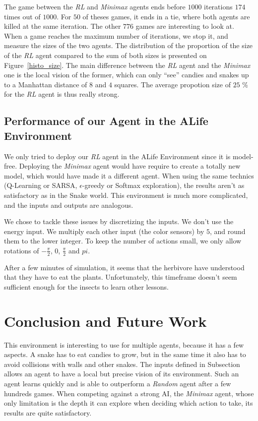 \documentclass[journal, a4paper]{IEEEtran}
\begin{document}
The game between the \emph{RL} and \emph{Minimax} agents ends before $1000$ iterations $174$ times out of $1000$.
For $50$ of theses games, it ends in a tie, where both agents are killed at the same iteration.
The other $776$ games are interesting to look at.
When a game reaches the maximum number of iterations, we stop it, and measure the sizes of the two agents.
The distribution of the proportion of the size of the \emph{RL} agent compared to the sum of both sizes is presented on Figure~\ref{histo_size}.
The main difference between the \emph{RL} agent and the \emph{Minimax} one is the local vision of the former, which can only ``see'' candies and snakes up to a Manhattan distance of $8$ and $4$ squares.
The average propotion size of $25$ \% for the \emph{RL} agent is thus really strong.

\subsection{Performance of our Agent in the ALife Environment}

We only tried to deploy our \emph{RL} agent in the ALife Environment since it is model-free.
Deploying the \emph{Minimax} agent would have require to create a totally new model, which would have made it a different agent.
When using the same technics (Q-Learning or SARSA, $\epsilon$-greedy or Softmax exploration), the results aren't as satisfactory as in the Snake world.
This environment is much more complicated, and the inputs and outputs are analogous.

We chose to tackle these issues by discretizing the inputs.
We don't use the energy input.
We multiply each other input (the color sensors) by $5$, and round them to the lower integer.
To keep the number of actions small, we only allow rotations of $-\frac{\pi}{2}$, $0$, $\frac{\pi}{2}$ and $pi$.

After a few minutes of simulation, it seems that the herbivore have understood that they have to eat the plants.
Unfortunately, this timeframe doesn't seem sufficient enough for the insects to learn other lessons.

\section{Conclusion and Future Work}
    This environment is interesting to use for multiple agents, because it has a few aspects.
    A snake has to eat candies to grow, but in the same time it also has to avoid collisions with walls and other snakes.
    The inputs defined in Subsection~\cite{rl_agent} allows an agent to have a local but precise vision of its environment.
    Such an agent learns quickly and is able to outperform a \emph{Random} agent after a few hundreds games.
    When competing against a strong AI, the \emph{Minimax} agent, whose only limitation is the depth it can explore when deciding which action to take, its results are quite satisfactory.
\end{document}
